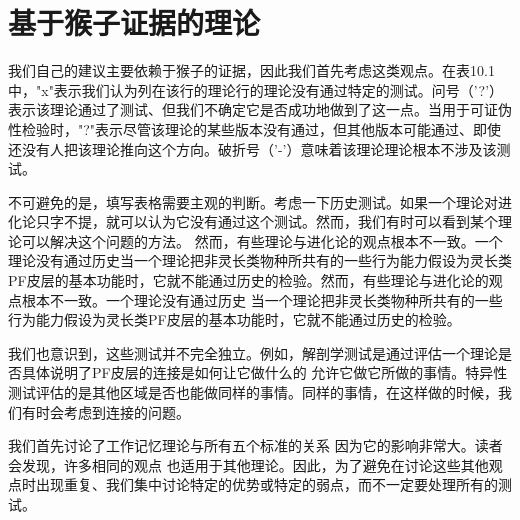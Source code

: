 \section{基于猴子证据的理论}
我们自己的建议主要依赖于猴子的证据，因此我们首先考虑这类观点。在表10.1中，"x"表示我们认为列在该行的理论行的理论没有通过特定的测试。问号（'?'）表示该理论通过了测试、但我们不确定它是否成功地做到了这一点。当用于可证伪性检验时，"?"表示尽管该理论的某些版本没有通过，但其他版本可能通过、即使还没有人把该理论推向这个方向。破折号（'-'）意味着该理论理论根本不涉及该测试。
\par 
不可避免的是，填写表格需要主观的判断。考虑一下历史测试。如果一个理论对进化论只字不提，就可以认为它没有通过这个测试。然而，我们有时可以看到某个理论可以解决这个问题的方法。 然而，有些理论与进化论的观点根本不一致。一个理论没有通过历史当一个理论把非灵长类物种所共有的一些行为能力假设为灵长类PF皮层的基本功能时，它就不能通过历史的检验。然而，有些理论与进化论的观点根本不一致。一个理论没有通过历史 当一个理论把非灵长类物种所共有的一些行为能力假设为灵长类PF皮层的基本功能时，它就不能通过历史的检验。
\par 
我们也意识到，这些测试并不完全独立。例如，解剖学测试是通过评估一个理论是否具体说明了PF皮层的连接是如何让它做什么的 允许它做它所做的事情。特异性测试评估的是其他区域是否也能做同样的事情。同样的事情，在这样做的时候，我们有时会考虑到连接的问题。
\par 
我们首先讨论了工作记忆理论与所有五个标准的关系 因为它的影响非常大。读者会发现，许多相同的观点 也适用于其他理论。因此，为了避免在讨论这些其他观点时出现重复、我们集中讨论特定的优势或特定的弱点，而不一定要处理所有的测试。
